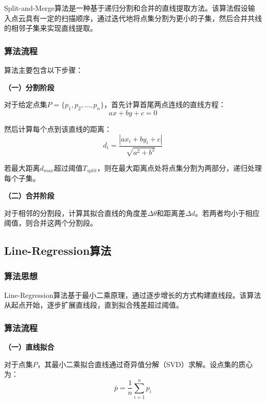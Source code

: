 \documentclass[12pt,a4paper]{article}
\begin{document}
Split-and-Merge算法是一种基于递归分割和合并的直线提取方法。该算法假设输入点云具有一定的扫描顺序，通过迭代地将点集分割为更小的子集，然后合并共线的相邻子集来实现直线提取。

\subsubsection{算法流程}

算法主要包含以下步骤：

\textbf{（一）分割阶段}

对于给定点集$P = \{p_1, p_2, \ldots, p_n\}$，首先计算首尾两点连线的直线方程：
\begin{equation}
    ax + by + c = 0
\end{equation}

然后计算每个点到该直线的距离：
\begin{equation}
    d_i = \frac{|ax_i + by_i + c|}{\sqrt{a^2 + b^2}}
\end{equation}

若最大距离$d_{max}$超过阈值$T_{split}$，则在最大距离点处将点集分割为两部分，递归处理每个子集。

\textbf{（二）合并阶段}

对于相邻的分割段，计算其拟合直线的角度差$\Delta\theta$和距离差$\Delta d$。若两者均小于相应阈值，则合并这两个分割段。

\subsection{Line-Regression算法}

\subsubsection{算法思想}

Line-Regression算法基于最小二乘原理，通过逐步增长的方式构建直线段。该算法从起点开始，逐步扩展直线段，直到拟合残差超过阈值。

\subsubsection{算法流程}

\textbf{（一）直线拟合}

对于点集$P$，其最小二乘拟合直线通过奇异值分解（SVD）求解。设点集的质心为：
\begin{equation}
    \bar{p} = \frac{1}{n}\sum_{i=1}^{n}p_i
\end{equation}
\end{document}
